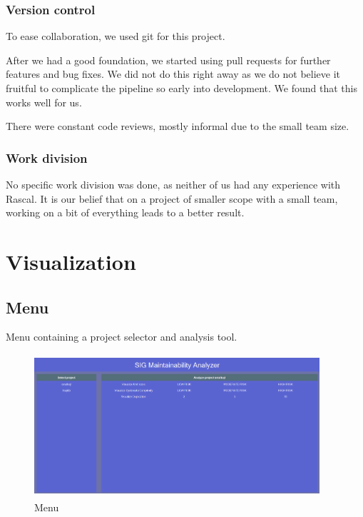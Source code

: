\documentclass{article}
\begin{document}
\subsubsection{Version control}
To ease collaboration, we used git for this project.

After we had a good foundation, we started using pull requests for further features and bug fixes. We did not do this right away as we do not believe it fruitful to complicate the pipeline so early into development. We found that this works well for us.

There were constant code reviews, mostly informal due to the small team size.

\subsubsection{Work division}
No specific work division was done, as neither of us had any experience with Rascal. It is our belief that on a project of smaller scope with a small team, working on a bit of everything leads to a better result.




\clearpage
\appendix
\appendixpage{}

\section{Visualization}
\label{appendix:visualization}
\subsection{Menu}
Menu containing a project selector and analysis tool.
\begin{figure}[!htbp]
	\centering
	\label{fig:vis-menu}
	\caption{Menu}
	\includegraphics[width=400px, height=200px]{vis_menu.png}
\end{figure}
\end{document}
